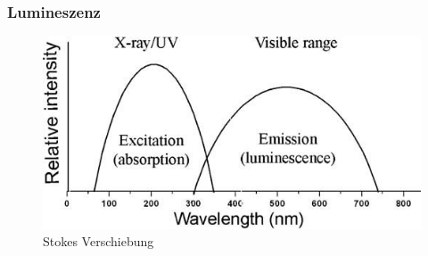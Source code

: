 \documentclass{beamer}
\begin{document}
\begin{frame}[t]\frametitle{Lumineszenz}
    
\begin{figure}[!h]
\centering
      \includegraphics[scale=0.3]{stokes.jpg}
      \caption*{\footnotesize Stokes Verschiebung }
 \end{figure}

\end{frame}
\end{document}
